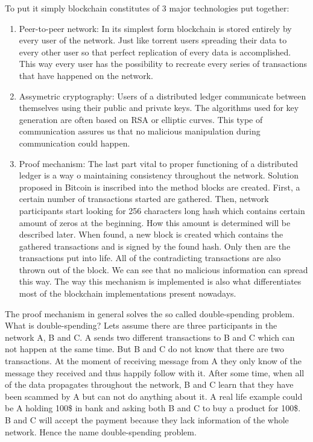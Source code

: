 \documentclass[a4paper,12pt,twoside,openany]{report}
\begin{document}
To put it simply blockchain constitutes of 3 major technologies put together:
\begin{enumerate}
\item Peer-to-peer network: In its simplest form blockchain is stored entirely by every user of the network. Just like torrent users spreading their data to every other user so that perfect replication of every data is accomplished. This way every user has the possibility to recreate every series of transactions that have happened on the network.
\item Assymetric cryptography: Users of a distributed ledger communicate between themselves using their public and private keys. The algorithms used for key generation are often based on RSA or elliptic curves. This type of communication assures us that no malicious manipulation during communication could happen.
\item Proof mechanism: The last part vital to proper functioning of a distributed ledger is a way o maintaining consistency throughout the network. Solution proposed in Bitcoin is inscribed into the method blocks are created. First, a certain number of transactions started are gathered. Then, network participants start looking for 256 characters long hash which contains certain amount of zeros at the beginning. How this amount is determined will be described later. When found, a new block is created which contains the gathered transactions and is signed by the found hash. Only then are the transactions put into life. All of the contradicting transactions are also thrown out of the block. We can see that no malicious information can spread this way. The way this mechanism is implemented is also what differentiates most of the blockchain implementations present nowadays. 
\end{enumerate}
The proof mechanism in general solves the so called double-spending problem. What is double-spending? Lets assume there are three participants in the network A, B and C. A sends two different transactions to B and C which can not happen at the same time. But B and C do not know that there are two transactions. At the moment of receiving message from A they only know of the message they received and thus happily follow with it. After some time, when all of the data propagates throughout the network, B and C learn that they have been scammed by A but can not do anything about it. A real life example could be A holding 100\$ in bank and asking both B and C to buy a product for 100\$. B and C will accept the payment because they lack information of the whole network. Hence the name double-spending problem.  
\end{document}
